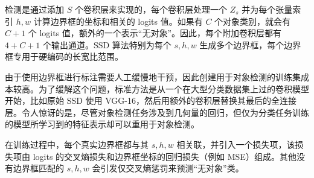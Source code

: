 检测是通过添加 $S$ 个卷积层来实现的，每个卷积层处理一个 $Z_s$ 并为每个张量索引 $h,w$ 计算边界框的坐标和相关的 logits 值。如果有 $C$ 个对象类别，就会有 $C + 1$ 个 logits 值，额外的一个表示``无对象''。因此，每个附加卷积层都有 $4 + C + 1$ 个输出通道。SSD 算法特别为每个 $s,h,w$ 生成多个边界框，每个边界框专用于硬编码的长宽比范围。

由于使用边界框进行标注需要人工缓慢地干预，因此创建用于对象检测的训练集成本较高。为了缓解这个问题，标准方法是从一个在大型分类数据集上过的卷积模型开始，比如原始 SSD 使用 VGG-16，然后用额外的卷积层替换其最后的全连接层。令人惊讶的是，尽管对象检测任务涉及到几何量的回归，但仅为分类任务训练的模型所学习到的特征表示却可以重用于对象检测。

在训练过程中，每个真实边界框都与其 $s,h,w$ 相关联，并引入一个损失项，该损失项由 logits 的交叉熵损失和边界框坐标的回归损失（例如 MSE）组成。其他没有边界框匹配的 $s,h,w$ 会引发仅交叉熵惩罚来预测``无对象''类。

